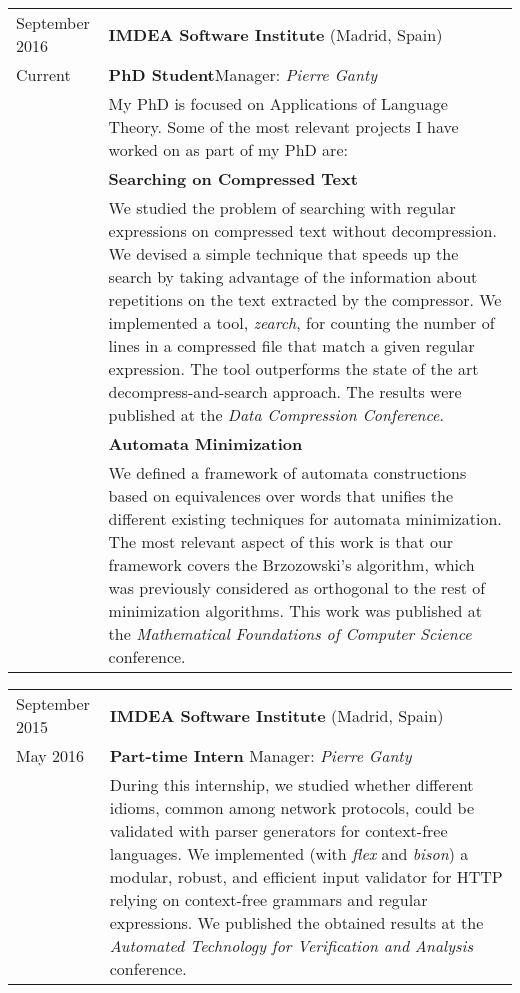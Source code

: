 \documentclass[a4paper,10pt]{article} %
\begin{document}
\begin{tabular}{p{2.5cm}p{13.2cm}}
{\small September 2016} & \textbf{IMDEA Software Institute} (Madrid, Spain) \\{\small 
Current} & \textcolor{azureblue}{\textbf{PhD Student}}\hfill Manager: \emph{Pierre Ganty}\\

& My PhD is focused on Applications of Language Theory.
Some of the most relevant projects I have worked on as part of my PhD are:\\
[3pt]
& \textcolor{battleshipgrey}{\textbf{Searching on Compressed Text}} \\
& We studied the problem of searching with regular expressions on compressed text without decompression. We devised a simple technique that speeds up the search by taking advantage of the information about repetitions on the text extracted by the compressor.
We implemented a tool, \emph{zearch}, for counting the number of lines in a compressed file that match a given regular expression.
The tool outperforms the state of the art decompress-and-search approach.
The results were published at the \emph{Data Compression Conference}. \\
[3pt]
& \textcolor{battleshipgrey}{\textbf{Automata Minimization}} \\
& We defined a framework of automata constructions based on equivalences over words that unifies the different existing techniques for automata minimization.
The most relevant aspect of this work is that our framework covers the Brzozowski's algorithm, which was previously considered as orthogonal to the rest of minimization algorithms.
This work was published at the \emph{Mathematical Foundations of Computer Science} conference.
\end{tabular}

\begin{tabular}{p{2.5cm}p{13.2cm}}
{\small September 2015} & \textbf{IMDEA Software Institute} (Madrid, Spain) \\
{\small May 2016} & \textcolor{azureblue}{\textbf{Part-time Intern}} \hfill Manager: \emph{Pierre Ganty} \\
& During this internship, we studied whether different idioms, common among network protocols, could be validated with parser generators for context-free languages.
We implemented (with \emph{flex} and \emph{bison}) a modular, robust, and efficient input validator for HTTP relying on context-free grammars and regular expressions.
We published the obtained results at the \emph{Automated Technology for Verification and Analysis} conference. 
\end{tabular}
\end{document}
